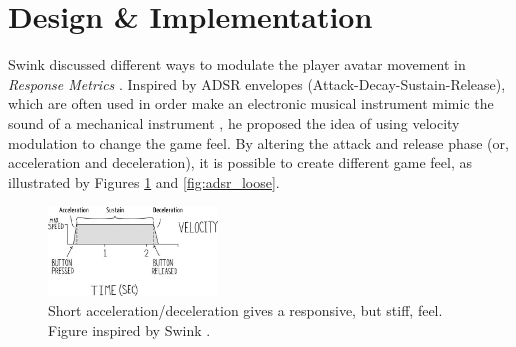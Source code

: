 \section{Design \& Implementation}
Swink discussed different ways to modulate the player avatar movement in \textit{Response Metrics} \cite{swink}. Inspired by ADSR envelopes (Attack-Decay-Sustain-Release), which are often used in order make an electronic musical instrument mimic the sound of a mechanical instrument \cite{adsr}, he proposed the idea of using velocity modulation to change the game feel. By altering the attack and release phase (or, acceleration and deceleration), it is possible to create different game feel, as illustrated by Figures \ref{fig:adsr_stiff} and \ref{fig:adsr_loose}.






\begin{figure}[htbp]
\centering
\includegraphics[width=0.40\textwidth]{Pics/adsr_stiff}
\caption{Short acceleration/deceleration gives a responsive, but stiff, feel. Figure inspired by Swink \cite{swink}.}
\label{fig:adsr_stiff}
\end{figure}

